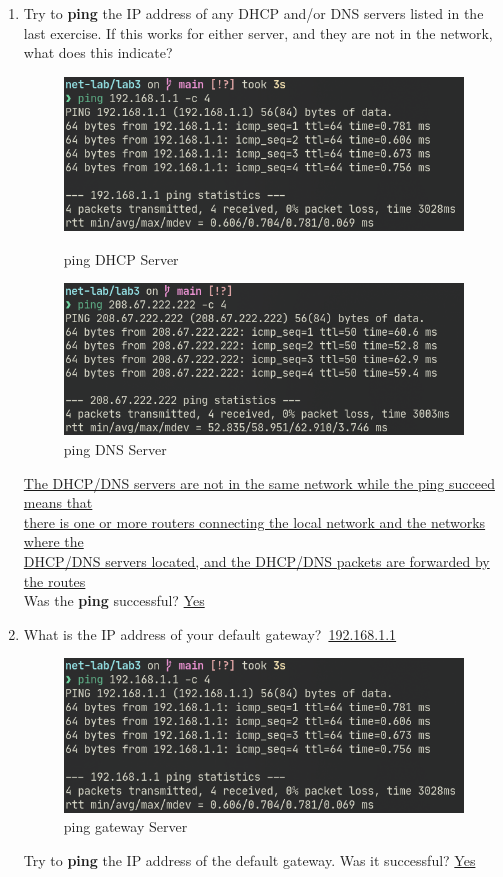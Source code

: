 \documentclass[a4paper]{ctexart}
\begin{document}
\begin{enumerate}
      \newpage
      \item Try to \textbf{ping} the IP address of any DHCP and/or DNS servers listed
      in the last exercise. If this works for either server, and they are not in the network,
      what does this indicate?
      \begin{figure}[H]
        \includegraphics*[width=1.0\textwidth]{fig/pinggateway.png}
        \caption[]{ping DHCP Server}
        \includegraphics*[width=1.0\textwidth]{fig/pingdns.png}
        \caption[]{ping DNS Server}
      \end{figure}
      \underline{The DHCP/DNS servers are not in the same network while the ping succeed means that}\\
      \underline{there is one or more routers connecting the local network and the networks where the}\\
      \underline{DHCP/DNS servers located, and the DHCP/DNS packets are forwarded by the routes}\\
      Was the \textbf{ping} successful? \underline{Yes}

      \newpage
      \item What is the IP address of your default gateway?\
      \underline{192.168.1.1}\\
      \begin{figure}[H]
        \includegraphics*[width=1.0\textwidth]{fig/pinggateway.png}
        \caption[]{ping gateway Server}
      \end{figure}
      Try to \textbf{ping} the IP address of the default gateway. Was it successful?
      \underline{Yes}


\end{enumerate}
\end{document}
